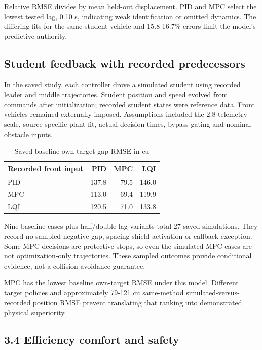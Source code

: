 \documentclass[11pt,a4paper]{article}
\begin{document}
Relative RMSE divides by mean held-out displacement. PID and MPC select the lowest tested lag, 0.10 s, indicating weak identification or omitted dynamics. The differing fits for the same student vehicle and 15.8-16.7\% errors limit the model's predictive authority.


\subsection*{Student feedback with recorded predecessors}

In the saved study, each controller drove a simulated student using recorded leader and middle trajectories. Student position and speed evolved from commands after initialization; recorded student states were reference data. Front vehicles remained externally imposed. Assumptions included the 2.8 telemetry scale, source-specific plant fit, actual decision times, bypass gating and nominal obstacle inputs.


\begin{table}[H]\centering\small\caption{Saved baseline own-target gap RMSE in cu}
\begin{tabular}{lrrr}
\toprule
Recorded front input & PID & MPC & LQI \\
\midrule

PID & 137.8 & 79.5 & 146.0 \\

MPC & 113.0 & 69.4 & 119.9 \\

LQI & 120.5 & 71.0 & 133.8 \\

\bottomrule\end{tabular}\end{table}

Nine baseline cases plus half/double-lag variants total 27 saved simulations. They record no sampled negative gap, spacing-shield activation or callback exception. Some MPC decisions are protective stops, so even the simulated MPC cases are not optimization-only trajectories. These sampled outcomes provide conditional evidence, not a collision-avoidance guarantee.


MPC has the lowest baseline own-target RMSE under this model. Different target policies and approximately 79-121 cu same-method simulated-versus-recorded position RMSE prevent translating that ranking into demonstrated physical superiority.


\newpage

\subsection*{3.4 Efficiency comfort and safety}
\end{document}
